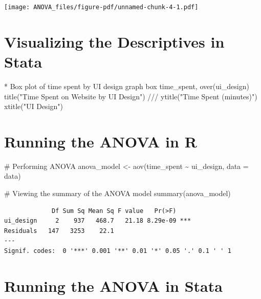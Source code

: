 \documentclass[
  letterpaper,
  DIV=11,
  numbers=noendperiod]{scrreprt}
\newenvironment{Shaded}{\begin{snugshade}}{\end{snugshade}}
\newcommand{\AttributeTok}[1]{\textcolor[rgb]{0.40,0.45,0.13}{#1}}
\newcommand{\BaseNTok}[1]{\textcolor[rgb]{0.68,0.00,0.00}{#1}}
\newcommand{\CommentTok}[1]{\textcolor[rgb]{0.37,0.37,0.37}{#1}}
\newcommand{\FunctionTok}[1]{\textcolor[rgb]{0.28,0.35,0.67}{#1}}
\newcommand{\KeywordTok}[1]{\textcolor[rgb]{0.00,0.23,0.31}{#1}}
\newcommand{\NormalTok}[1]{\textcolor[rgb]{0.00,0.23,0.31}{#1}}
\newcommand{\OtherTok}[1]{\textcolor[rgb]{0.00,0.23,0.31}{#1}}
\newcommand{\SpecialCharTok}[1]{\textcolor[rgb]{0.37,0.37,0.37}{#1}}
\newcommand{\StringTok}[1]{\textcolor[rgb]{0.13,0.47,0.30}{#1}}
\begin{document}
\texttt{[image: ANOVA\_files/figure-pdf/unnamed-chunk-4-1.pdf]}

\section{Visualizing the Descriptives in
Stata}\label{visualizing-the-descriptives-in-stata}

\begin{Shaded}
\begin{Highlighting}[]
\NormalTok{* Box plot }\KeywordTok{of}\NormalTok{ time spent }\KeywordTok{by}\NormalTok{ UI design}
\KeywordTok{graph}\NormalTok{ box time\_spent, }\BaseNTok{over}\NormalTok{(ui\_design) }\BaseNTok{title}\NormalTok{(}\StringTok{"Time Spent on Website by UI Design"}\NormalTok{) }\CommentTok{///}
    \BaseNTok{ytitle}\NormalTok{(}\StringTok{"Time Spent (minutes)"}\NormalTok{) }\BaseNTok{xtitle}\NormalTok{(}\StringTok{"UI Design"}\NormalTok{)}
\end{Highlighting}
\end{Shaded}

\section{Running the ANOVA in R}\label{running-the-anova-in-r}

\begin{Shaded}
\begin{Highlighting}[]
\CommentTok{\# Performing ANOVA}
\NormalTok{anova\_model }\OtherTok{\textless{}{-}} \FunctionTok{aov}\NormalTok{(time\_spent }\SpecialCharTok{\textasciitilde{}}\NormalTok{ ui\_design, }\AttributeTok{data =}\NormalTok{ data)}

\CommentTok{\# Viewing the summary of the ANOVA model}
\FunctionTok{summary}\NormalTok{(anova\_model)}
\end{Highlighting}
\end{Shaded}

\begin{verbatim}
             Df Sum Sq Mean Sq F value   Pr(>F)    
ui_design     2    937   468.7   21.18 8.29e-09 ***
Residuals   147   3253    22.1                     
---
Signif. codes:  0 '***' 0.001 '**' 0.01 '*' 0.05 '.' 0.1 ' ' 1
\end{verbatim}

\section{Running the ANOVA in Stata}\label{running-the-anova-in-stata}
\end{document}
